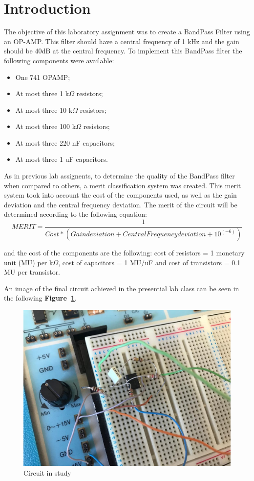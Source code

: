 \section{Introduction}
\label{sec:introduction}


\par The objective of this laboratory assignment was to create a BandPass Filter using an OP-AMP. This filter should have a central frequency of 1 kHz and the gain should be 40dB at the central frequency. To implement this BandPass filter the following components were available: 
\begin{itemize}

\item One 741 OPAMP;
\item At most three 1 k$\Omega$ resistors;
\item At most three 10 k$\Omega$ resistors;
\item At most three 100 k$\Omega$ resistors;
\item At most three 220 nF capacitors;
\item At most three 1 uF capacitors.

\end{itemize} 


\par   
As in previous lab assignents, to determine the quality of the BandPass filter when compared to others, a merit classification system was created. This merit system took into account the cost of the components used, as well as the gain deviation and the central frequency deviation. The merit of the circuit will be determined according to the following equation: 
\begin {equation}
	 MERIT = \frac{1}{Cost*(Gain deviation + Central Frequency deviation + 10^(-6))  }   	
	\label{eq:i1}
\end{equation}

and the cost of the components are the following: cost of resistors = 1 monetary unit (MU) per k$\Omega$, cost of capacitors = 1 MU/uF
and cost of transistors = 0.1 MU per transistor. 

An image of the final circuit achieved in the presential lab class can be seen in the following \textbf{Figure~\ref{fig:circuit_t5}}.\par
\begin{figure}[h] \centering
\includegraphics[width=0.6\linewidth]{circuit_t5.jpg}
\caption{Circuit in study}
\label{fig:circuit_t5}
\end{figure}


